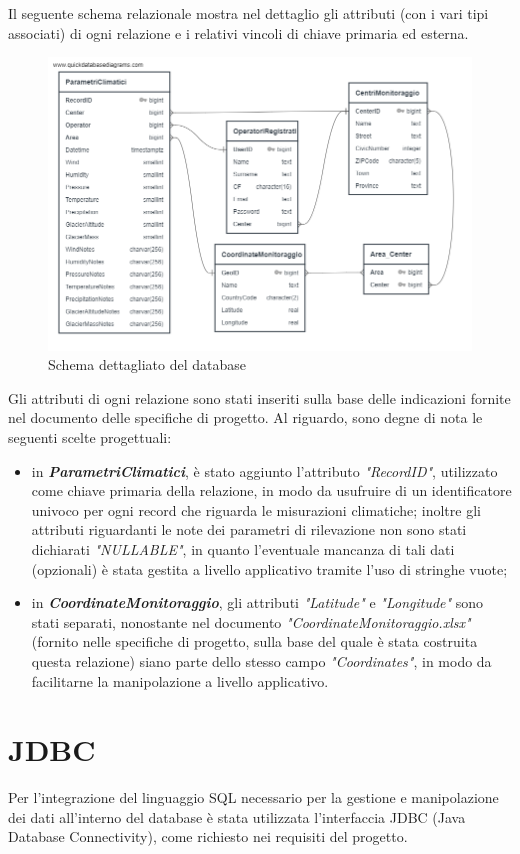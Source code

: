 Il seguente schema relazionale mostra nel dettaglio gli attributi (con i vari tipi associati) di ogni relazione e i relativi vincoli di chiave primaria ed esterna.

\begin{figure}[h]
	\centering
	\caption{Schema dettagliato del database}
	\label{fig:quickdbd-clima}
	\includegraphics[width=0.8\linewidth]{../../fig/img/tecnico/QuickDBD-clima}
\end{figure}

Gli attributi di ogni relazione sono stati inseriti sulla base delle indicazioni fornite nel documento delle specifiche di progetto. Al riguardo, sono degne di nota le seguenti scelte progettuali:
\begin{itemize}
	\item in \textit{\textbf{ParametriClimatici}}, è stato aggiunto l'attributo \textit{"RecordID"}, utilizzato come chiave primaria della relazione, in modo da usufruire di un identificatore univoco per ogni record che riguarda le misurazioni climatiche; inoltre gli attributi riguardanti le note dei parametri di rilevazione non sono stati dichiarati \textit{"NULLABLE"}, in quanto l'eventuale mancanza di tali dati (opzionali) è stata gestita a livello applicativo tramite l'uso di stringhe vuote;
	\item in \textit{\textbf{CoordinateMonitoraggio}}, gli attributi \textit{"Latitude"} e \textit{"Longitude"} sono stati separati, nonostante nel documento \textit{"CoordinateMonitoraggio.xlsx"} (fornito nelle specifiche di progetto, sulla base del quale è stata costruita questa relazione) siano parte dello stesso campo \textit{"Coordinates"}, in modo da facilitarne la manipolazione a livello applicativo.
\end{itemize}

\section{JDBC}
Per l'integrazione del linguaggio SQL necessario per la gestione e manipolazione dei dati all'interno del database è stata utilizzata l'interfaccia JDBC (Java Database Connectivity), come richiesto nei requisiti del progetto.

